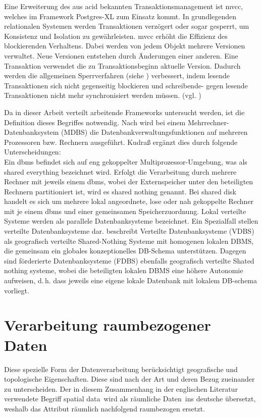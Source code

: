 Eine Erweiterung des aus \Gls{acid} bekannten Transaktionsmanagement ist \Gls{mvcc}, welches im Framework Postgres-XL zum Einsatz kommt.
In grundlegenden relationalen Systemen werden Transaktionen verzögert oder sogar gesperrt, um Konsistenz und Isolation zu gewährleisten.
\Gls{mvcc} erhöht die Effizienz des  blockierenden Verhaltens.
Dabei werden von jedem Objekt mehrere Versionen verwaltet.
Neue Versionen entstehen durch Änderungen einer anderen.
Eine Transaktion verwendet die zu Transaktionsbeginn aktuelle Version.
Dadurch werden die allgemeinen Sperrverfahren (siehe \cite[S.266 ff.]{book:kudrass}) verbessert, indem lesende Transaktionen sich nicht gegenseitig blockieren und schreibende- gegen lesende Transaktionen nicht mehr synchronisiert werden müssen. (vgl. \cite[S.270]{book:kudrass})

Da in dieser Arbeit verteilt arbeitende Frameworks untersucht werden, ist die Definition dieses Begriffes notwendig.
Nach \cite[S.394]{book:kudrass} wird bei einem Mehrrechner-Datenbanksystem (MDBS) die Datenbankverwaltungsfunktionen auf mehreren Prozessoren bzw. Rechnern ausgeführt.
Kudraß ergänzt dies durch folgende Unterscheidungen:\\
Ein \Gls{dbms} befindet sich auf eng gekoppelter Multiprozessor-Umgebung, was als shared everything bezeichnet wird.
Erfolgt die Verarbeitung durch mehrere Rechner mit jeweils einem \Gls{dbms}, wobei der Externspeicher unter den beteiligten Rechnern partitioniert ist, wird es shared nothing genannt.
Bei shared disk handelt es sich um mehrere lokal angeordnete, lose oder nah gekoppelte Rechner mit je einem \Gls{dbms} und einer gemeinsamen Speicherzuordnung.
Lokal verteilte Systeme werden als parallele Datenbanksysteme bezeichnet.
Ein Spezialfall stellen verteilte Datenbanksysteme dar.
\cite[S.398]{book:kudrass} beschreibt Verteilte Datenbanksysteme (VDBS) als geografisch verteilte Shared-Nothing Systeme mit homogenen lokalen DBMS, die gemeinsam ein globales konzeptionelles DB-Schema unterstützen.
Dagegen sind förderierte Datenbanksysteme (FDBS) ebenfalls geografisch verteilte Shated nothing systeme, wobei die beteiligten lokalen DBMS eine höhere Autonomie aufweisen, d.\,h. dass jeweils eine eigene lokale Datenbank mit lokalem DB-schema vorliegt.


\section{Verarbeitung raumbezogener Daten}
Diese spezielle Form der Datenverarbeitung berücksichtigt geografische und topologische Eigenschaften.
Diese sind nach der Art und deren Bezug zueinander zu unterscheiden.
Der in diesem Zusammenhang in der englischen Literatur verwendete Begriff \glqq{}spatial data\grqq\ wird als \glqq{}räumliche Daten\grqq\ ins deutsche übersetzt, weshalb das Attribut räumlich nachfolgend raumbezogen ersetzt.

